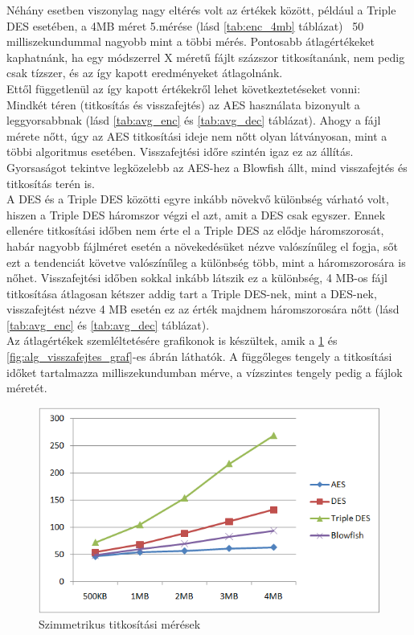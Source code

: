 \noindent Néhány esetben viszonylag nagy eltérés volt az értékek között, például a Triple DES esetében, a 4MB méret 5.mérése (lásd \ref{tab:enc_4mb} táblázat) ~50 milliszekundummal nagyobb mint a többi mérés. Pontosabb átlagértékeket kaphatnánk, ha egy módszerrel X méretű fájlt százszor titkosítanánk, nem pedig csak tízszer, és az így kapott eredményeket átlagolnánk.
\vspace{5pt}\\Ettől függetlenül az így kapott értékekről lehet következtetéseket vonni:
\vspace{5pt}\\Mindkét téren (titkosítás és visszafejtés) az AES használata bizonyult a leggyorsabbnak (lásd \ref{tab:avg_enc} és \ref{tab:avg_dec} táblázat). Ahogy a fájl mérete nőtt, úgy az AES titkosítási ideje nem nőtt olyan látványosan, mint a többi algoritmus esetében. Visszafejtési időre szintén igaz ez az állítás. 
\vspace{5pt}\\Gyorsaságot tekintve legközelebb az AES-hez a Blowfish állt, mind visszafejtés és titkosítás terén is. 
\vspace{5pt}\\A DES és a Triple DES közötti egyre inkább növekvő különbség várható volt, hiszen a Triple DES háromszor végzi el azt, amit a DES csak egyszer. Ennek ellenére titkosítási időben nem érte el a Triple DES az elődje háromszorosát, habár nagyobb fájlméret esetén a növekedésüket nézve valószínűleg el fogja, sőt ezt a tendenciát követve valószínűleg a különbség több, mint a háromszorosára is nőhet. Visszafejtési időben sokkal inkább látszik ez a különbség, 4 MB-os fájl titkosítása átlagosan kétszer addig tart a Triple DES-nek, mint a DES-nek, visszafejtést nézve 4 MB esetén ez az érték majdnem háromszorosára nőtt (lásd \ref{tab:avg_enc} és \ref{tab:avg_dec} táblázat).
\vspace{5pt}\\ Az átlagértékek szemléltetésére grafikonok is készültek, amik a \ref{fig:alg_titkositas_graf} és \ref{fig:alg_visszafejtes_graf}-es ábrán láthatók. A függőleges tengely a titkosítási időket tartalmazza milliszekundumban mérve, a vízszintes tengely pedig a fájlok méretét.
\begin{figure}[H]
	\centering
	\includegraphics[scale=0.8]{images/alg_graf_1.png}
	\caption{Szimmetrikus titkosítási mérések}
	\label{fig:alg_titkositas_graf}
\end{figure}

